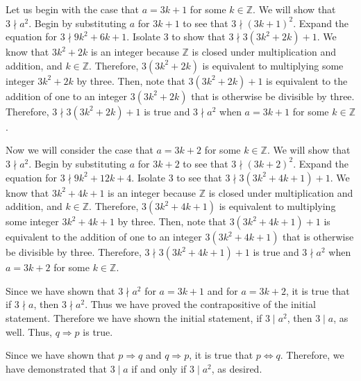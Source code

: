 \documentclass[12pt]{exam}
\begin{document}
\begin{questions}
\begin{parts}
\par
Let us begin with the case that $a = 3k +1$ for some $k\in\mathbb{Z}$. We will show that $3 \nmid a^2$. Begin by substituting $a$ for $3k +1$ to see that $3 \nmid (3k+1)^2$. Expand the equation for $3 \nmid 9k^2+6k+1$. Isolate 3 to show that $3 \nmid 3(3k^2+2k)+1$. We know that $3k^2+2k$ is an integer because $\mathbb{Z}$ is closed under multiplication and addition, and $k \in\mathbb{Z}$. Therefore, $3(3k^2+2k)$ is equivalent to multiplying some integer $3k^2+2k$ by three. Then, note that $3(3k^2+2k)+1$ is equivalent to the addition of one to an integer $3(3k^2+2k)$ that is otherwise be divisible by three. Therefore, $3 \nmid 3(3k^2+2k)+1$ is true and $3 \nmid a^2$ when $a = 3k +1$ for some $k\in\mathbb{Z}$.
\par
Now we will consider the case that $a = 3k +2$ for some $k\in\mathbb{Z}$. We will show that $3 \nmid a^2$. Begin by substituting $a$ for $3k +2$ to see that $3 \nmid (3k+2)^2$. Expand the equation for $3 \nmid 9k^2 + 12k + 4$. Isolate 3 to see that $3 \nmid 3(3k^2 + 4k + 1) + 1$. We know that $3k^2 + 4k + 1$ is an integer because $\mathbb{Z}$ is closed under multiplication and addition, and $k \in\mathbb{Z}$. Therefore, $3(3k^2 + 4k + 1)$ is equivalent to multiplying some integer $3k^2 + 4k + 1$ by three. Then, note that $3(3k^2 + 4k + 1)+1$ is equivalent to the addition of one to an integer $3(3k^2 + 4k + 1)$ that is otherwise be divisible by three. Therefore, $3 \nmid 3(3k^2 + 4k + 1) + 1$ is true and $3 \nmid a^2$ when $a = 3k +2$ for some $k\in\mathbb{Z}$.
\par
Since we have shown that $3 \nmid a^2$ for $a = 3k +1$ and for $a = 3k +2$, it is true that if $3 \nmid a$, then $3 \nmid a^2$. Thus we have proved the contrapositive of the initial statement. Therefore we have shown the initial statement, if $3 \mid a^2$, then $3 \mid a$, as well. Thus, $q \Rightarrow p$ is true.
\par
Since we have shown that $p \Rightarrow q$ and $q \Rightarrow p$, it is true that $p \Leftrightarrow q$. Therefore, we have demonstrated that $3 \mid a$ if and only if $3 \mid a^2$, as desired.

\end{parts}
\end{questions}
\end{document}
